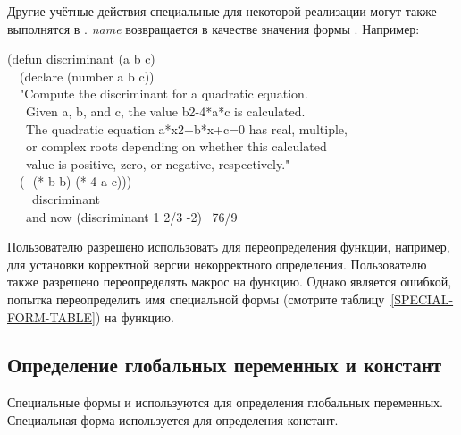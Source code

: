 \begin{defmac}
Другие учётные действия специальные для некоторой реализации могут также
выполнятся в . \emph{name} возвращается в качестве значения формы
.
Например:
\begin{lisp}
(defun discriminant (a b c) \\
~~(declare (number a b c)) \\
~~"Compute the discriminant for a quadratic equation. \\
~~~Given a, b, and c, the value b{\Xcircumflex}2-4*a*c is calculated. \\
~~~The quadratic equation a*x{\Xcircumflex}2+b*x+c=0 has real, multiple, \\
~~~or complex roots depending on whether this calculated \\
~~~value is positive, zero, or negative, respectively." \\
~~(- (* b b) (* 4 a c))) \\
~~~\EV\ discriminant \\
~~~\textrm{and now} (discriminant 1 2/3 -2) \EV\ 76/9
\end{lisp}

Пользователю разрешено использовать  для переопределения функции, например, для
установки корректной версии некорректного определения.
Пользователю также разрешено переопределять макрос на функцию.
Однако является ошибкой, попытка переопределить имя специальной формы (смотрите
таблицу~\ref{SPECIAL-FORM-TABLE}) на функцию.
\end{defmac}

\subsection{Определение глобальных переменных и констант}

Специальные формы  и  используются для определения
глобальных переменных.
Специальная форма  используется для определения констант.

